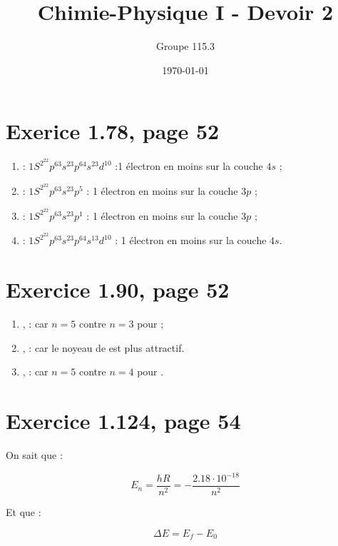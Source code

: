 \documentclass{article}
\title{Chimie-Physique I - Devoir 2}
\author{Groupe 115.3}
\date{\today}
\begin{document}
\maketitle

\section{Exerice 1.78, page 52}

\begin{enumerate}
  \item {} : $1S^2^22p^63s^23p^64s^23d^10$ :1 électron en moins sur la couche $4s$ ;
  \item {} : $1S^2^22p^63s^23p^5$ : 1 électron en moins sur la couche $3p$ ;
  \item {} : $1S^2^22p^63s^23p^1$ : 1 électron en moins sur la couche $3p$ ;
  \item {} : $1S^2^22p^63s^23p^64s^13d^10$ : 1 électron en moins sur la couche $4s$.
\end{enumerate}

\section{Exercice 1.90, page 52}

\begin{enumerate}
	\item {},  :  car $n = 5$ contre $n = 3$ pour  ;
	\item {},  :  car le noyeau de  est plus attractif.
	\item {},  :  car $n = 5$ contre $n = 4$ pour .
\end{enumerate}

\section{Exercice 1.124, page 54}

On sait que : %

$$E_n = \frac{hR}{n^2} = -\frac{2.18 \cdot 10^{-18}}{n^2}$$

Et que : %

$$\Delta E = E_f - E_0$$
\end{document}
